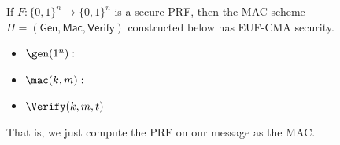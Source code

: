 \begin{theorem}
    If $F : \{0, 1\}^n \to \{0, 1\}^n$ is a secure PRF, then the MAC scheme $\Pi = (\mathsf{Gen}, \mathsf{Mac}, \mathsf{Verify})$ constructed below has EUF-CMA security.

    \begin{itemize}
        \item $\gen(1^n):$
        \item $\mac(k,m):$
        \item $\Verify(k, m, t)$
    \end{itemize}
    That is, we just compute the PRF on our message as the MAC.
\end{theorem}

